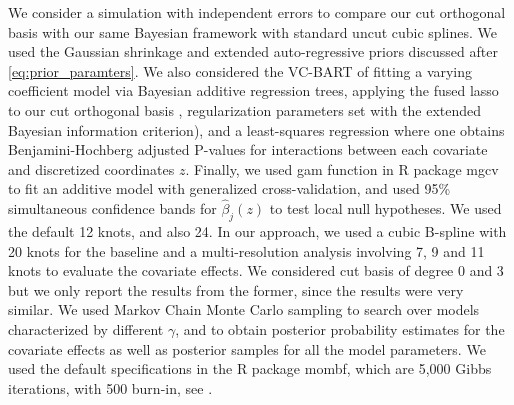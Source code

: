 We consider a simulation with independent errors to compare our cut orthogonal basis with our same Bayesian framework with standard uncut cubic splines.
 We used the Gaussian shrinkage and extended auto-regressive priors discussed after \eqref{eq:prior_paramters}. 
We also considered the VC-BART of  \cite{deshpande:2024}  fitting a varying coefficient model via Bayesian additive regression trees,
 applying the fused lasso to our cut orthogonal basis \citep{tibshirani:2005}, regularization parameters set with the extended Bayesian information criterion), 
and a least-squares regression where one obtains Benjamini-Hochberg adjusted P-values for interactions between each covariate and discretized coordinates $z$.
 Finally, we used gam function in R package mgcv to fit an additive model with generalized cross-validation, and used 95\% simultaneous confidence bands for $\hat{\beta}_j(z)$ to test local null hypotheses. We used the default 12 knots, and also 24. 
In our approach, we used a cubic B-spline with 20 knots for the baseline and a multi-resolution analysis involving 7, 9 and 11 knots to evaluate  the covariate effects. 
We considered cut basis of degree 0 and 3 but we only report the results from the former, since the results were very similar.
We used Markov Chain Monte Carlo  sampling to search over models characterized by different $\gamma$, and to obtain posterior probability estimates for the covariate effects as well as posterior samples for all the model parameters. We used the default specifications in the R package mombf, which are 5,000 Gibbs iterations, with 500 burn-in, see \cite{rossell:2017}. %




